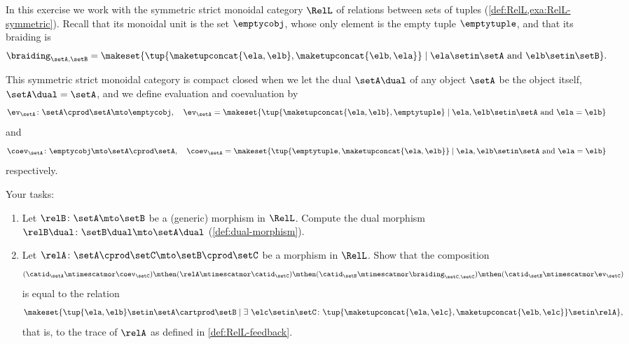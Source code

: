 \begin{gradedexercise}
    \label{ex:RelDualsTrace}

    In this exercise we work with the symmetric strict monoidal category $\RelL$ of relations between sets of tuples (\cref{def:RelL,exa:RelL-symmetric}).
    Recall that its monoidal unit is the set $\emptycobj$, whose only element is the empty tuple $\emptytuple$, and that its braiding is
    \begin{equation}
        \braiding_{\setA, \setB} = \makeset{ \tup{\maketupconcat{\ela, \elb}, \maketupconcat{\elb, \ela}} \mid \ela \setin \setA \text{ and } \elb \setin \setB }.
    \end{equation}

    This symmetric strict monoidal category is compact closed when we let the dual $\setA \dual$ of any object $\setA$ be the object itself, $\setA \dual = \setA$, and we define evaluation and coevaluation by
    \begin{equation}
        \ev_\setA \colon \setA \cprod \setA \mto \emptycobj, \quad \ev_\setA = \makeset{\tup{\maketupconcat{\ela, \elb}, \emptytuple} \mid \ela, \elb \setin \setA \text{ and } \ela = \elb}
    \end{equation}
    and
    \begin{equation}
        \coev_\setA \colon \emptycobj \mto \setA \cprod \setA, \quad \coev_\setA = \makeset{\tup{\emptytuple, \maketupconcat{\ela, \elb}} \mid \ela, \elb \setin \setA \text{ and } \ela = \elb}
    \end{equation}
    respectively.

    Your tasks:
    \begin{enumerate}
        \item
              Let $\relB \colon \setA \mto \setB$ be a (generic) morphism in $\RelL$.
              Compute the dual morphism $\relB\dual \colon \setB\dual \mto \setA\dual$ (\cref{def:dual-morphism}).

        \item
              Let $\relA \colon \setA \cprod \setC \mto \setB \cprod \setC$ be a morphism in $\RelL$.
              Show that the composition
              \begin{equation}
                  (\catid_\setA \mtimescatmor \coev_\setC) \mthen (\relA \mtimescatmor \catid_\setC) \mthen (\catid_\setB \mtimescatmor \braiding_{\setC, \setC}) \mthen (\catid_\setB \mtimescatmor \ev_\setC)
              \end{equation}
              is equal to the relation
              \begin{equation}
                  \makeset{\tup{\ela, \elb} \setin\setA \cartprod \setB \mid \exists \ \elc \setin \setC \colon \tup{\maketupconcat{\ela, \elc},\maketupconcat{\elb,\elc}} \setin \relA},
              \end{equation}
              that is, to the trace of $\relA$ as defined in \cref{def:RelL-feedback}.
    \end{enumerate}
\end{gradedexercise}




